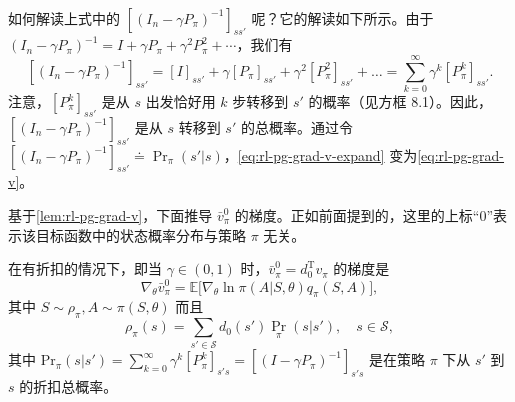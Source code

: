 \begin{note}
\begin{equation}
\begin{aligned}
\end{aligned}
\label{eq:rl-pg-grad-v-expand}
\end{equation}
如何解读上式中的 $\left[(I_n - \gamma P_\pi)^{-1}\right]_{ss'}$ 呢？它的解读如下所示。由于 $(I_n - \gamma P_\pi)^{-1} = I + \gamma P_{\pi} + \gamma^{2}P_{\pi}^{2} + \cdots$，我们有
\begin{equation}
\left[(I_n - \gamma P_{\pi})^{-1}\right]_{ss'} = [I]_{ss'} + \gamma [P_{\pi}]_{ss'} + \gamma^{2} [P_{\pi}^{2}]_{ss'} + \dots = \sum_{k=0}^{\infty} \gamma^{k} [P_{\pi}^{k}]_{ss'}.
\end{equation}
注意，$[P_{\pi}^{k}]_{ss'}$ 是从 $s$ 出发恰好用 $k$ 步转移到 $s'$ 的概率（见方框 8.1）。因此，$\left[(I_n - \gamma P_\pi)^{-1}\right]_{ss'}$ 是从 $s$ 转移到 $s'$ 的总概率。通过令 $\left[(I_n - \gamma P_\pi)^{-1}\right]_{ss'} \doteq \operatorname*{Pr}_{\pi}(s'|s)$，\cref{eq:rl-pg-grad-v-expand} 变为\cref{eq:rl-pg-grad-v}。
\end{note}

基于\cref{lem:rl-pg-grad-v}，下面推导 $\bar{v}_{\pi}^{0}$ 的梯度。正如前面提到的，这里的上标“0”表示该目标函数中的状态概率分布与策略 $\pi$ 无关。

\begin{theorem}
\label{thm:rl-pg-9-2}
在有折扣的情况下，即当 $\gamma \in (0,1)$ 时，$\bar{v}_{\pi}^{0} = d_0^{\mathrm{T}} v_{\pi}$ 的梯度是
\begin{equation}
\nabla_{\theta} \bar{v}_{\pi}^{0} = \mathbb{E}\big[ \nabla_{\theta} \ln \pi(A|S,\theta) q_{\pi}(S,A) \big],
\end{equation}
其中 $S\sim \rho_{\pi}, A\sim \pi(S,\theta)$ 而且
\begin{equation}
\rho_{\pi}(s) = \sum_{s' \in \mathcal{S}} d_0(s') \operatorname*{Pr}_{\pi}(s|s'), \quad s \in \mathcal{S},
\label{eq:rl-pg-rho}
\end{equation}
其中 $\mathrm{Pr}_{\pi}(s|s') = \sum_{k=0}^{\infty}\gamma^{k}[P_{\pi}^{k}]_{s's} = \left[(I - \gamma P_{\pi})^{-1}\right]_{s's}$ 是在策略 $\pi$ 下从 $s'$ 到 $s$ 的折扣总概率。
\end{theorem}

